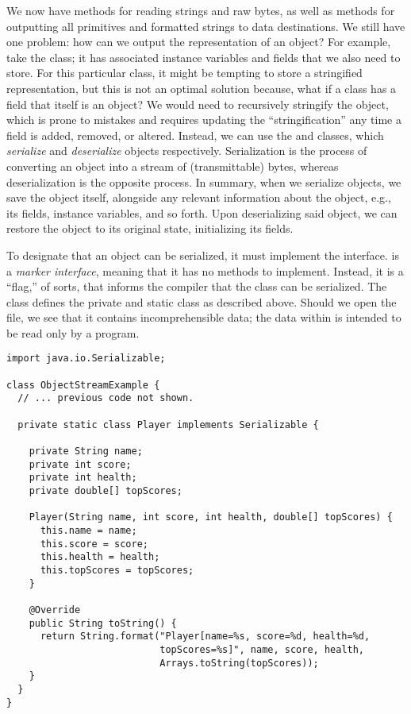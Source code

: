 We now have methods for reading strings and raw bytes, as well as methods for outputting all primitives and formatted strings to data destinations.
We still have one problem: how can we output the representation of an object? For example, take the  class; it has associated instance variables and fields that we also need to store. 
For this particular class, it might be tempting to store a stringified representation, but this is not an optimal solution because, what if a class has a field that itself is an object? 
We would need to recursively stringify the object, which is prone to mistakes and requires updating the ``stringification'' any time a field is added, removed, or altered. 
Instead, we can use the  and  classes, which \emph{serialize} and \emph{deserialize} objects respectively. 
Serialization is the process of converting an object into a stream of (transmittable) bytes, whereas deserialization is the opposite process. 
In summary, when we serialize objects, we save the object itself, alongside any relevant information about the object, e.g., its fields, instance variables, and so forth. 
Upon deserializing said object, we can restore the object to its original state, initializing its fields.

To designate that an object can be serialized, it must implement the  interface. 
 is a \emph{marker interface}, meaning that it has no methods to implement. 
Instead, it is a ``flag,'' of sorts, that informs the compiler that the class can be serialized. 
The  class defines the private and static  class as described above. 
Should we open the  file, we see that it contains incomprehensible data; the data within is intended to be read only by a program.

\enlargethispage{-4\baselineskip}
\begin{lstlisting}[language=MyJava]
import java.io.Serializable;

class ObjectStreamExample {
  // ... previous code not shown.

  private static class Player implements Serializable {

    private String name;
    private int score;
    private int health;
    private double[] topScores;
    
    Player(String name, int score, int health, double[] topScores) {
      this.name = name;
      this.score = score;
      this.health = health;
      this.topScores = topScores;
    }
    
    @Override
    public String toString() {
      return String.format("Player[name=%s, score=%d, health=%d, 
                           topScores=%s]", name, score, health, 
                           Arrays.toString(topScores));
    }
  }
}
\end{lstlisting}

